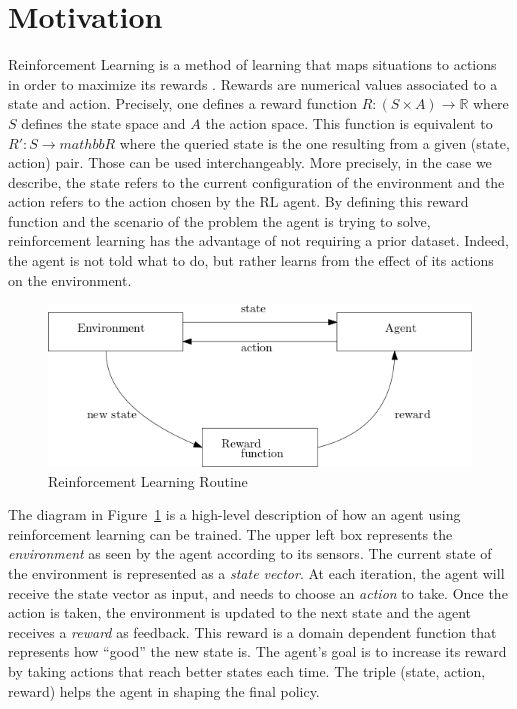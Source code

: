 \section{Motivation} 

Reinforcement Learning is a method of learning that maps situations to
actions in order to maximize its rewards
\cite{sutton2018reinforcement}. Rewards are numerical values
associated to a state and action. Precisely, one defines a reward
function $R : (S \times A) \rightarrow \mathbb{R}$ where $S$ defines the state space and $A$ the action space.
This function is equivalent to $R' : S \rightarrow mathbb{R}$ where the queried state is the one resulting from a given (state, action) pair. 
Those can be used interchangeably. More precisely, in the case we describe, the state refers to the current configuration
of the environment and the action refers to the action chosen by the RL agent. By defining this reward function and the scenario of the problem the agent is trying to solve, 
reinforcement learning has the advantage of not requiring a prior dataset. Indeed, the agent is not told what to do, but rather 
learns from the effect of its actions on the environment. 

\begin{figure}[H]
  \centering
  \includegraphics[scale=0.4]{figures/rlroutine.png}
  \caption{Reinforcement Learning Routine}
  \label{fig:rl}
\end{figure}


The diagram in Figure~\ref{fig:rl} is a high-level description of how
an agent using reinforcement learning can be trained.  
%
The upper left box represents the \emph{environment} as seen by the agent
according to its sensors.
%
The current state of the environment is represented as a \emph{state
vector}.
%
At each iteration, the agent will receive the state vector as input,
and needs to choose an \emph{action} to take.
%
Once the action is taken, the environment is updated to the next state
and the agent receives a \emph{reward} as feedback.
%
This reward is a domain dependent function that represents how
``good'' the new state is.
%
The agent's goal is to increase its reward by taking actions that
reach better states each time.
%
The triple (state, action, reward) helps the agent in shaping the
final policy.

